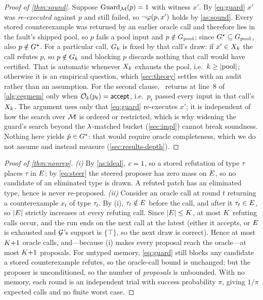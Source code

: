 \begin{proof}[Proof of \cref{thm:sound}]
Suppose $\mathrm{Guard}_{\mathcal{M}}(p) = 1$ with witness $x'$. By \cref{eq:guard}
$x'$ was \emph{re-executed} against $p$ and still failed, so
$\lnot\varphi(p, x')$ holds by \cref{as:sound}. Every stored counterexample was
returned by an earlier oracle call and therefore lies in the fault's shipped
pool, so $p$ fails a pool input and $p \notin G_{\mathrm{pool}}$; since
$G^{\star} \subseteq G_{\mathrm{pool}}$, also $p \notin G^{\star}$. For a particular call, $G_{k}$
is fixed by that call's draw: if $x' \in X_{k}$ the call refutes $p$, so
$p \notin G_{k}$ and blocking $p$ discards nothing that call would have
certified. That is automatic whenever $X_{k}$ exhausts the pool, i.e.\
$k \ge \lvert\mathrm{pool}\rvert$; otherwise it is an empirical
question, which \cref{sec:theory} settles with an audit rather than an
assumption. For the second clause, \CEGMem\ returns at line~8 of
\cref{alg:cegmem} only when $\mathcal{O}_{k}(p_t) = \textsf{accept}$, i.e.\ $p_t$ passed
every input in that call's $X_{k}$. The argument uses only that \cref{eq:guard}
re-executes $x'$;
it is independent of how the search over $\mathcal{M}$ is ordered or restricted,
which is why widening the guard's search beyond the $\lambda$-matched bucket
(\cref{sec:impl}) cannot break soundness. Nothing here yields
$\hat p \in G^{\star}$: that would require oracle completeness, which we do not
assume and instead measure (\cref{sec:results-depth}).
\end{proof}

\begin{proof}[Proof of \cref{thm:nonrep}]
\emph{(i)} By \cref{as:ideal}, $c = 1$, so a stored refutation of type
$\tau$ places $\tau$ in $E$; by \cref{eq:steer} the steered proposer has
zero mass on $E$, so no candidate of an eliminated type is drawn. A refuted
patch has an eliminated type, hence is never re-proposed.
\emph{(ii)} Consider an oracle call at round $t$ returning a counterexample
$x_t$ of type $\tau_t$. By (i), $\tau_t \notin E$ before the call, and
after it $\tau_t \in E$, so $|E|$ strictly increases at every refuting
call. Since $|E| \le K$, at most $K$ refuting calls occur, and
the run ends on the next call at the latest (either it accepts, or $E$ is
exhausted and $\mathcal{G}$'s support is $\{\top\}$, so the next draw is correct).
Hence at most $K{+}1$ oracle calls, and---because (i) makes every
proposal reach the oracle---at most $K{+}1$ proposals. For untyped
memory, \cref{eq:guard} still blocks any candidate a stored counterexample
refutes, so the oracle-call bound is unchanged; but the proposer is
unconditioned, so the number of \emph{proposals} is unbounded. With no memory,
each round is an independent trial with success probability $\pi$, giving
$1/\pi$ expected calls and no finite worst case.
\end{proof}

